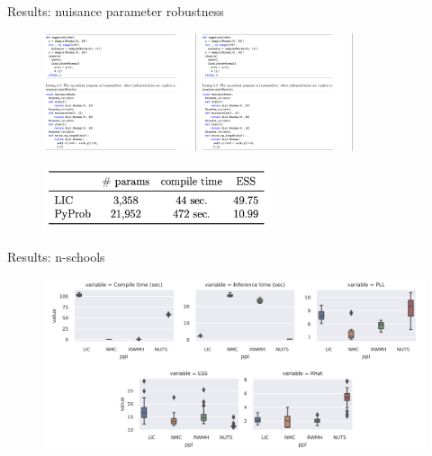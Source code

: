\begin{frame}{Results: nuisance parameter robustness}
    \begin{figure}[p]
        \centering
        \includegraphics[width=0.4\textwidth,trim={0 16cm 20cm 0.5cm},clip]{Figures/lic/nuisance-progs.png}
        \includegraphics[width=0.4\textwidth,trim={0 0.5cm 20cm 12.5cm},clip]{Figures/lic/nuisance-progs.png}
    \end{figure}
    \begin{figure}
        \centering
        \includegraphics[width=0.6\textwidth]{Figures/lic/nuisance-params.png}
    \end{figure}
\end{frame}

\begin{frame}{Results: n-schools}
    \begin{figure}
        \centering
        \includegraphics[width=\textwidth]{Figures/lic/nschools.png}
    \end{figure}
\end{frame}

